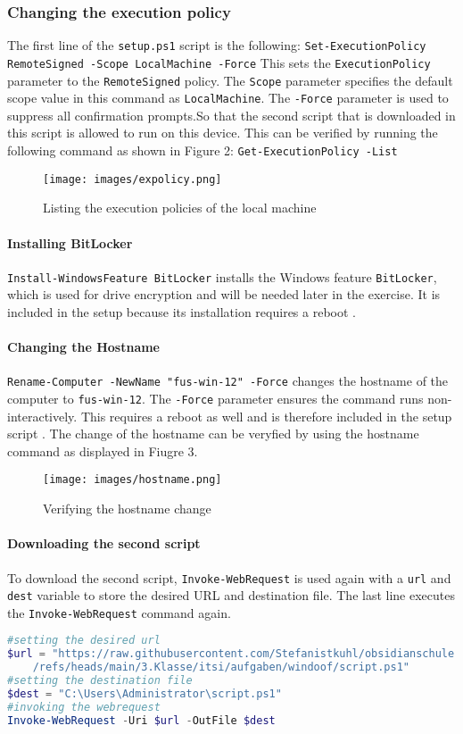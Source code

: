 \documentclass[a4paper]{article}
\newcommand{\abc}{\hfill \break}
\begin{document}
\subsubsection{Changing the execution policy}
The first line of the \texttt{setup.ps1} script is the following:\abc
\texttt{Set-ExecutionPolicy RemoteSigned -Scope LocalMachine -Force}\abc\abc
This sets the \texttt{ExecutionPolicy} parameter to the \texttt{RemoteSigned} policy. The \texttt{Scope} parameter specifies the default scope value in this command as \texttt{LocalMachine}. The \texttt{-Force} parameter is used to suppress all confirmation prompts.So that the second script that is downloaded in this script is allowed to run on this device.\cite{Set-ExecutionPolicy}\abc
This can be verified by running the following command as shown in Figure 2:\abc
\texttt{Get-ExecutionPolicy -List}
\begin{figure}[h]
	\texttt{[image: images/expolicy.png]}
	\centering
	\caption{Listing the execution policies of the local machine}
\end{figure}
\newpage

\paragraph{Installing BitLocker}\abc
\texttt{Install-WindowsFeature BitLocker} installs the Windows feature \texttt{BitLocker}, which is used for drive encryption and will be needed later in the exercise. It is included in the setup because its installation requires a reboot \cite{Install-WindowsFeature,BitLocker}.

\paragraph{Changing the Hostname}\abc
\texttt{Rename-Computer -NewName "fus-win-12" -Force} changes the hostname of the computer to \texttt{fus-win-12}. The \texttt{-Force} parameter ensures the command runs non-interactively. This requires a reboot as well and is therefore included in the setup script \cite{rename-computer}.\abc
The change of the hostname can be veryfied by using the {hostname} command as displayed in Fiugre 3.
\begin{figure}[h]
	\texttt{[image: images/hostname.png]}
	\centering
	\caption{Verifying the hostname change}
\end{figure}
\paragraph{Downloading the second script}\abc
To download the second script, \texttt{Invoke-WebRequest} is used again with a \texttt{url} and \texttt{dest} variable to store the desired URL and destination file. The last line executes the \texttt{Invoke-WebRequest} command again.
\begin{lstlisting}[language=PowerShell]
#setting the desired url
$url = "https://raw.githubusercontent.com/Stefanistkuhl/obsidianschule
	/refs/heads/main/3.Klasse/itsi/aufgaben/windoof/script.ps1"
#setting the destination file
$dest = "C:\Users\Administrator\script.ps1"
#invoking the webrequest
Invoke-WebRequest -Uri $url -OutFile $dest
\end{lstlisting}
\end{document}
